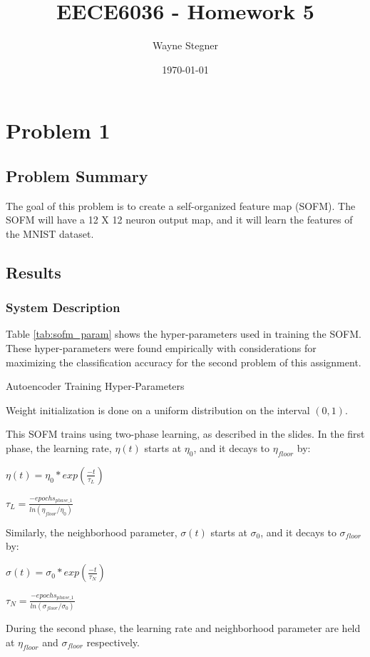 \documentclass[a4paper, 12pt, titlepage]{article}
\title{EECE6036 - Homework 5}
\author{Wayne Stegner}
\date{\today}
\newcommand{\tabRef}[1]{Table \ref{#1}}
\begin{document}
  \maketitle
  \section{Problem 1}
  \subsection{Problem Summary}
  \par The goal of this problem is to create a self-organized feature map
  (SOFM).
  The SOFM will have a 12 X 12 neuron output map, and it will learn the
  features of the MNIST dataset.

  \subsection{Results}
  \subsubsection{System Description}
  \par \tabRef{tab:sofm_param} shows the hyper-parameters used in training the
  SOFM.
  These hyper-parameters were found empirically with considerations for
  maximizing the classification accuracy for the second problem of this
  assignment.
  \begin{table}[htb]
    \centering
    \caption{Autoencoder Training Hyper-Parameters}
    \label{tab:sofm_param}
  \end{table}
  \par Weight initialization is done on a uniform distribution on the interval
  $(0, 1)$.
  \par This SOFM trains using two-phase learning, as described in the slides.
  In the first phase, the learning rate, $\eta(t)$ starts at $\eta_{0}$, and it
  decays to $\eta_{floor}$ by:
  \begin{center}
    \par $\eta(t) = \eta_{0} * exp(\frac{-t}{\tau_{L}})$
  \end{center}
  \begin{center}
    \par $\tau_{L} = \frac{-epochs_{phase\_1}}{ln(\eta_{floor} / \eta_{0})}$
  \end{center}
  \par Similarly, the neighborhood parameter, $\sigma(t)$ starts at
  $\sigma_{0}$, and it decays to $\sigma_{floor}$ by:
  \begin{center}
    \par $\sigma(t) = \sigma_{0} * exp(\frac{-t}{\tau_{N}})$
  \end{center}
  \begin{center}
    \par $\tau_{N} = \frac{-epochs_{phase\_1}}{ln(\sigma_{floor} / \sigma_0)}$
  \end{center}
  \par During the second phase, the learning rate and neighborhood parameter
  are held at $\eta_{floor}$ and $\sigma_{floor}$ respectively.
\end{document}
